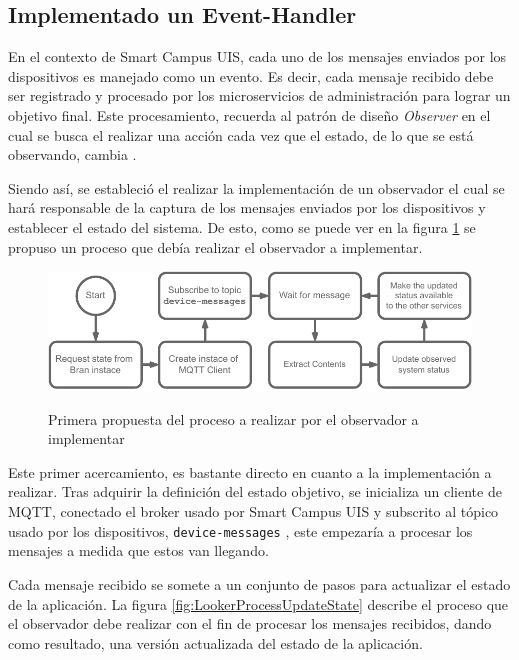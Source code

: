 
\subsection{Implementado un Event-Handler}

En el contexto de Smart Campus UIS, cada uno de los mensajes enviados por los dispositivos es manejado como un evento. Es decir, cada mensaje recibido debe ser registrado y procesado por los microservicios de administración para lograr un objetivo final. Este procesamiento, recuerda al patrón de diseño \textit{Observer} en el cual se busca el realizar una acción cada vez que el estado, de lo que se está observando, cambia \cite{Shvets2019}.

Siendo así, se estableció el realizar la implementación de un observador el cual se hará responsable de la captura de los mensajes enviados por los dispositivos y establecer el estado del sistema. De esto, como se puede ver en la figura \ref{fig:procesoLooker} se propuso un proceso que debía realizar el observador a implementar.

\begin{figure}[ht]
    \caption{Primera propuesta del proceso a realizar \linebreak por el observador a implementar} 
    \centering
    \includegraphics[width=\linewidth]{images/LookerProcess.pdf}
    \label{fig:procesoLooker}
\end{figure} 

Este primer acercamiento, es bastante directo en cuanto a la implementación a realizar. Tras adquirir la definición del estado objetivo, se inicializa un cliente de MQTT, conectado el broker usado por Smart Campus UIS y subscrito al tópico usado por los dispositivos, \texttt{device-messages} \cite{SmartCampusGithub}, este empezaría a procesar los mensajes a medida que estos van llegando. 

Cada mensaje recibido se somete a un conjunto de pasos para actualizar el estado de la aplicación. La figura \ref{fig:LookerProcessUpdateState} describe el proceso que el observador debe realizar con el fin de procesar los mensajes recibidos, dando como resultado, una versión actualizada del estado de la aplicación. 


